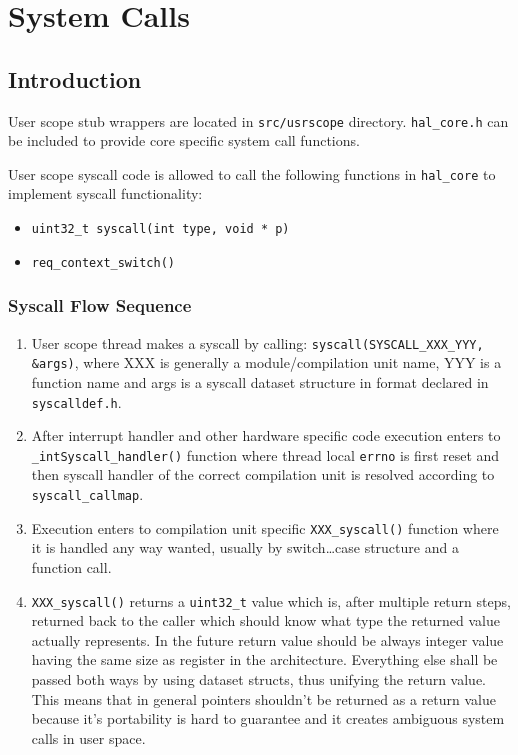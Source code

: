 \part{System Calls}

\chapter{Introduction}
User scope stub wrappers are located in \verb+src/usrscope+ directory.
\verb+hal_core.h+ can be included to provide core specific system call
functions.

User scope syscall code is allowed to call the following functions in
\verb+hal_core+ to implement syscall functionality:

\begin{itemize}
  \item \verb+uint32_t syscall(int type, void * p)+
  \item \verb+req_context_switch()+
\end{itemize}

\section{Syscall Flow Sequence}

\begin{enumerate}
\item User scope thread makes a syscall by calling:
      \verb+syscall(SYSCALL_XXX_YYY, &args)+, where XXX is generally a
      module/compilation unit name, YYY is a function name and args is a
      syscall dataset structure in format declared in \verb+syscalldef.h+.

\item After interrupt handler and other hardware specific code execution enters
      to \verb+_intSyscall_handler()+ function where thread local \verb+errno+
      is first reset and then syscall handler of the correct compilation unit is
      resolved according to \verb+syscall_callmap+.

\item Execution enters to compilation unit specific \verb+XXX_syscall()+
      function where it is handled any way wanted, usually by switch\ldots case
      structure and a function call.

\item \verb+XXX_syscall()+ returns a \verb+uint32_t+ value which is, after
      multiple return steps, returned back to the caller which should know
      what type the returned value actually represents. In the future return
      value should be always integer value having the same size as register
      in the architecture. Everything else shall be passed both ways by using
      dataset structs, thus unifying the return value. This means that in
      general pointers shouldn't be returned as a return value because it's
      portability is hard to guarantee and it creates ambiguous system calls
      in user space.
\end{enumerate}


